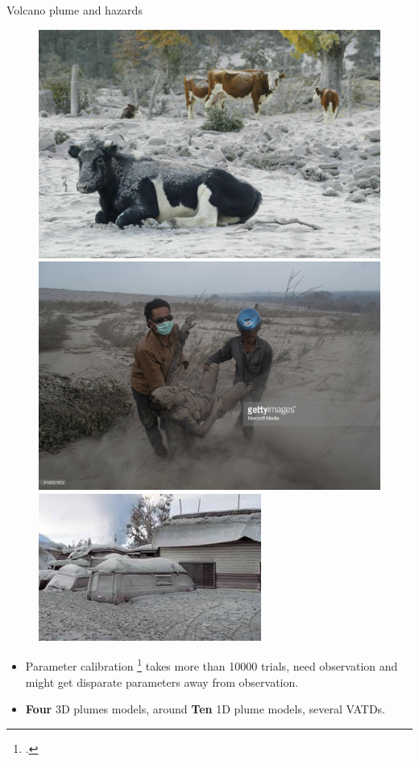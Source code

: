 \documentclass{beamer}
\begin{document}
\begin{frame}{Volcano plume and hazards}
\begin{figure}[!t]
\begin{minipage}{.325\textwidth}
\center
\includegraphics[width=.85\textwidth]{./PPT/Ash_community}
\end{minipage}
\begin{minipage}{.325\textwidth}
\center
\includegraphics[width=.85\textwidth]{./PPT/Ash_community4}
\end{minipage}
\begin{minipage}{.325\textwidth}
\center
\includegraphics[width=.85\textwidth]{./PPT/Ash_community3}
\end{minipage}
\end{figure}
\begin{itemize}
\item Parameter calibration \footcite{fero2009simulating} takes more than 10000 trials, need observation and might get disparate parameters away from observation.
\item \textbf{Four} 3D plumes models, around \textbf{Ten} 1D plume models, several VATDs.
\end{itemize}


\end{frame}
\end{document}
